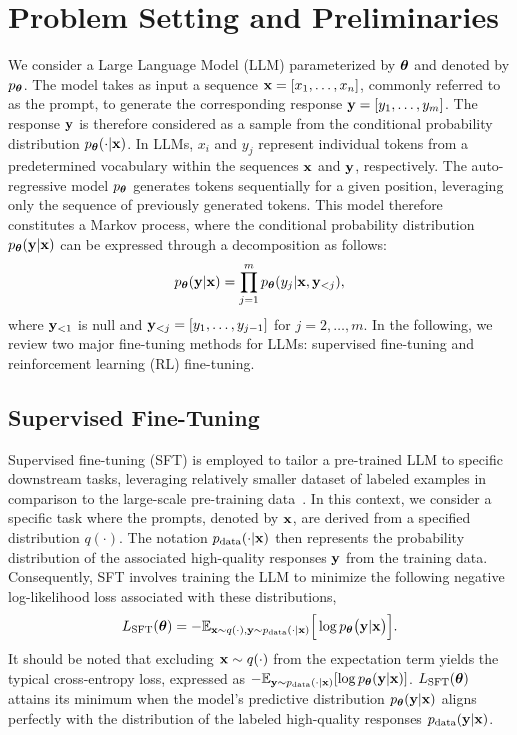 \documentclass{article}
\begin{document}
\section{Problem Setting and Preliminaries}\label{section:problemsetting}
We consider a Large Language Model (LLM) parameterized by $\bm{\theta}$ and denoted by $p_{\bm{\theta}}$. The model takes as input a sequence $\mathbf{x} = [x_1, \ldots, x_n]$, commonly referred to as the prompt, to generate the corresponding response $\mathbf{y} = [y_1, \ldots, y_m]$. The response $\mathbf{y}$ is therefore considered as a sample from the conditional probability distribution $p_{\bm{\theta}}(\cdot|\mathbf{x})$. In LLMs, $x_i$ and $y_j$ represent individual tokens from a predetermined vocabulary within the sequences $\mathbf{x}$ and $\mathbf{y}$, respectively. 
The auto-regressive model $p_{\bm{\theta}}$ generates tokens sequentially for a given position, leveraging only the sequence of previously generated tokens. 
This model therefore constitutes a Markov process, where the conditional probability distribution $p_{\bm{\theta}}(\mathbf{y}|\mathbf{x})$ can be expressed through a decomposition as follows:
\begin{align*}
p_{\bm{\theta}}(\mathbf{y}|\mathbf{x}) = \prod_{j=1}^{m}p_{\bm{\theta}}(y_{j}|\mathbf{x}, \mathbf{y}_{<j}),   
\end{align*}
where $\mathbf{y}_{<1}$ is null and $\mathbf{y}_{<j} = [y_1,\ldots, y_{j-1}]$ for $j=2,\ldots,m$. 
In the following, we review two major fine-tuning methods for LLMs: supervised fine-tuning and reinforcement learning (RL) fine-tuning. 


\subsection{Supervised Fine-Tuning}
Supervised fine-tuning (SFT) is employed to tailor a pre-trained LLM to specific downstream tasks, leveraging  relatively smaller dataset of labeled examples in comparison to the large-scale pre-training data~\citep{ouyang2022training,yu2023metamath}. 
In this context, we consider a specific task where the prompts, denoted by $\mathbf{x}$, are derived from a specified distribution $q(\cdot)$.  
The notation $p_{\mathrm{data}}(\cdot|\mathbf{x})$ then represents the probability distribution of the associated high-quality responses $\mathbf{y}$ from the training data. 
Consequently, SFT involves training the LLM to minimize the following negative log-likelihood loss associated with these distributions, 
\begin{align}
L_{\mathrm{SFT}}(\bm{\theta}) = -\mathbb{E}_{\mathbf{x}\sim q(\cdot), \mathbf{y}\sim p_{\mathrm{data}}(\cdot|\mathbf{x})}\Big[\log p_{\bm{\theta}}\big(\mathbf{y}|\mathbf{x}\big)\Big].\label{eq:sft}   
\end{align}
It should be noted that excluding $\mathbf{x}\sim q(\cdot)$ from the expectation term yields the typical cross-entropy loss, expressed as $-\mathbb{E}_{\mathbf{y}\sim p_{\mathrm{data}}(\cdot|\mathbf{x})}[\log p_{\bm{\theta}}(\mathbf{y}|\mathbf{x})]$. 
$L_{\mathrm{SFT}}(\bm{\theta})$ attains its minimum when the model's predictive distribution $p_{\bm{\theta}}(\mathbf{y}|\mathbf{x})$ aligns perfectly with the distribution of the labeled high-quality responses $p_{\mathrm{data}}(\mathbf{y}|\mathbf{x})$. 
\end{document}
